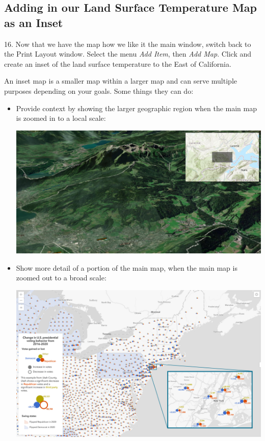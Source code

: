 \documentclass[oneside,a4paper,11pt,explicit]{book}
\begin{document}
\subsection{Adding in our Land Surface Temperature Map as an Inset}

16. Now that we have the map how we like it the main window, switch back to the Print Layout window. Select the menu \textit{Add Item}, then \textit{Add Map}. Click and create an inset of the land surface temperature to the East of California.

\begin{tcolorbox}[enhanced jigsaw,breakable,pad at break*=1mm,
  colback=blue!5!white,colframe=blue!75!black,title=Inset Maps]
  An inset map is a smaller map within a larger map and can serve multiple purposes depending on your goals. Some things they can do:
    \begin{itemize}
         \item Provide context by showing the larger geographic region when the main map is zoomed in to a local scale:

         \vspace{.25em}
         
         \centerline{\includegraphics[width=.85\textwidth]{inset-overview.png}}

         \item Show more detail of a portion of the main map, when the main map is zoomed out to a broad scale:

         \vspace{.25em}
         
         \centerline{\includegraphics[width=.85\textwidth]{inset-detail.png}}


\end{itemize}
\end{tcolorbox}
\end{document}
